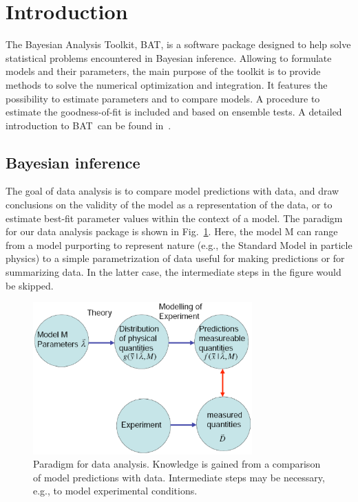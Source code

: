 \documentclass[11pt, a4paper]{article}
\newcommand{\bat}{{\sc BAT}}
\begin{document}
\section{Introduction}
\label{section:introduction}

The Bayesian Analysis Toolkit, \bat, is a software package designed to
help solve statistical problems encountered in Bayesian
inference. Allowing to formulate models and their parameters, the main
purpose of the toolkit is to provide methods to solve the numerical
optimization and integration. It features the possibility to estimate
parameters and to compare models. A procedure to estimate the
goodness-of-fit is included and based on ensemble tests. A detailed
introduction to \bat\ can be found in~\cite{Caldwell:2008fw}.

\subsection{Bayesian inference}

The goal of data analysis is to compare model predictions with data,
and draw conclusions on the validity of the model as a representation
of the data, or to estimate best-fit parameter values within the
context of a model. The paradigm for our data analysis package is
shown in Fig.~\ref{fig:scheme}.  Here, the model M can range from a
model purporting to represent nature (e.g., the Standard Model in
particle physics) to a simple parametrization of data useful for
making predictions or for summarizing data.  In the latter case, the
intermediate steps in the figure would be skipped. \\

\begin{figure}[htbp] %
\centering
\includegraphics[width=0.75\textwidth]{scheme.eps} 
\caption{Paradigm for data analysis.  Knowledge is gained from a
comparison of model predictions with data.  Intermediate steps may be
necessary, e.g., to model experimental conditions.}
\label{fig:scheme}
\end{figure}
\end{document}
